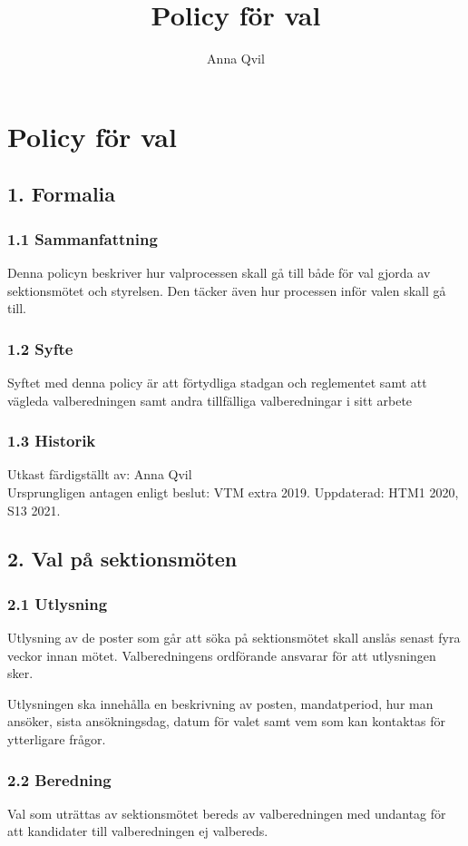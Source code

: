 \documentclass{dsekkallelse}
\title{Policy för val}
\author{Anna Qvil}
\begin{document}
\section{Policy för val}

\subsection{1. Formalia}

\subsubsection{1.1 Sammanfattning}
Denna policyn beskriver hur valprocessen skall gå till både för val gjorda av sektionsmötet och styrelsen. Den täcker även hur processen inför valen skall gå till. 

\subsubsection{1.2 Syfte}
Syftet med denna policy är att förtydliga stadgan och reglementet samt att vägleda valberedningen samt andra tillfälliga valberedningar i sitt arbete

\subsubsection{1.3 Historik}
Utkast färdigställt av: Anna Qvil \\
Ursprungligen antagen enligt beslut: VTM extra 2019.
Uppdaterad: HTM1 2020, S13 2021. 

\subsection{2. Val på sektionsmöten}

\subsubsection{2.1 Utlysning}
Utlysning av de poster som går att söka på sektionsmötet skall anslås senast fyra veckor innan mötet. Valberedningens ordförande ansvarar för att utlysningen sker. 

Utlysningen ska innehålla en beskrivning av posten, mandatperiod, hur man ansöker, sista  ansökningsdag, datum för valet samt vem som kan kontaktas för ytterligare frågor. 

\subsubsection{2.2 Beredning}
Val som uträttas av sektionsmötet bereds av valberedningen med undantag för att kandidater till valberedningen ej valbereds. 
\end{document}
